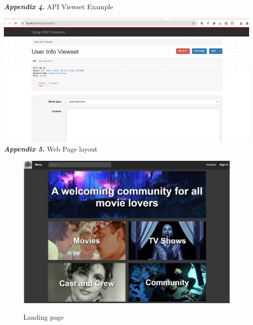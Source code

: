 \documentclass[letterpaper,twocolumn]{article}
\newcommand{\myparagraph}[1]{\vspace{0.1cm}\noindent \textbf{\textit{#1.}}}
\begin{document}
\clearpage
\myparagraph{Appendix 4} API Viewset Example
\vspace{2ex}

\includegraphics[scale=0.5]{images/WhatsApp Image 2024-12-13 at 16.01.10.jpeg}\\[0.1cm] 

\clearpage
\myparagraph{Appendix 5} Web Page layout
\vspace{2ex}

\begin{figure}[h!]
\centering
\includegraphics[scale=0.6]{images/Landing_page.jpg}\\[0.1cm] 
\caption{Landing page}
\label{landingpage}
\end{figure}
\end{document}

